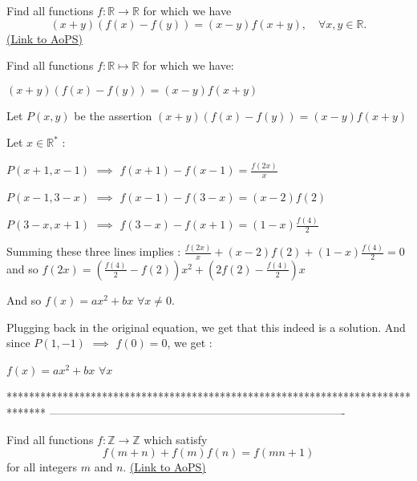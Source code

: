 \begin{problem}
	Find all functions $ f: \mathbb {R}\to\mathbb {R}$ for which we have
\[ (x+y)(f(x)-f(y))=(x-y)f(x+y), \quad \forall x,y \in \mathbb R.\]
	\flushright \href{https://artofproblemsolving.com/community/c6h319317}{(Link to AoPS)}
\end{problem}



\begin{solution}
	\begin{tcolorbox}Find all functions $ f: \mathbb {R}\mapsto \mathbb {R}$ for which we have:

$ (x + y)(f(x) - f(y)) = (x - y)f(x + y)$\end{tcolorbox}

Let $ P(x,y)$ be the assertion $ (x+y)(f(x)-f(y))=(x-y)f(x+y)$

Let $ x\in\mathbb R^*$ :

$ P(x+1,x-1)$ $ \implies$ $ f(x+1)-f(x-1)=\frac{f(2x)}x$

$ P(x-1,3-x)$ $ \implies$ $ f(x-1)-f(3-x)=(x-2)f(2)$

$ P(3-x,x+1)$ $ \implies$ $ f(3-x)-f(x+1)=(1-x)\frac{f(4)}2$

Summing these three lines implies : $ \frac{f(2x)}x+(x-2)f(2)+(1-x)\frac{f(4)}2=0$ and so $ f(2x)=\left(\frac{f(4)}2-f(2)\right)x^2+\left(2f(2)-\frac{f(4)}2\right)x$

And so $ f(x)=ax^2+bx$ $ \forall x\ne 0$.

Plugging back in the original equation, we get that this indeed is a solution. And since $ P(1,-1)$ $ \implies$ $ f(0)=0$, we get :

$ \boxed{f(x)=ax^2+bx}$ $ \forall x$
\end{solution}
*******************************************************************************
-------------------------------------------------------------------------------

\begin{problem}
	Find all functions $f: \mathbb Z \to \mathbb Z$ which satisfy
\[ f(m+n) + f(m)f(n) = f(mn+1 )\]
for all integers $m$ and $n$.
	\flushright \href{https://artofproblemsolving.com/community/c6h319361}{(Link to AoPS)}
\end{problem}



